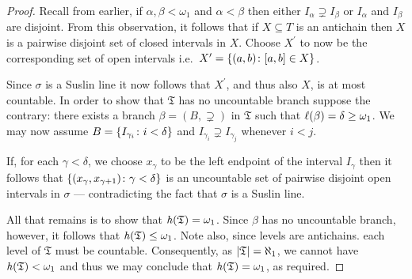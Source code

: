 \begin{proof}
	Recall from earlier, if $\alpha,\beta<\omega_1$ and $\alpha<\beta$ then
	either $I_\alpha\supsetneq I_\beta$ or $I_\alpha$ and $ I_\beta$ are
	disjoint.  From this observation, it follows that if $X\subseteq T$ is an
	antichain then $X$ is a pairwise disjoint set of closed intervals in $X$.
	Choose $X^\prime$ to now be the corresponding set of open intervals i.e.\
	$X^\prime=\left\lbrace (a,b)\colon [a,b]\in X \right\rbrace$.

	Since $\sigma$ is a Suslin line it now follows that $X^\prime$, and thus
	also $X$, is at most countable.  In order to show that $\mathfrak{T}$ has no
	uncountable branch suppose the contrary: there exists a branch
	$\beta=(B,\supsetneq)$ in $\mathfrak{T}$ such that
	$\ell(\beta)=\delta\geq\omega_1$.  We may now assume
	$B=\left\lbrace I_{\gamma_{i}}\colon i<\delta \right\rbrace$ and
	$I_{\gamma_i}\supsetneq I_{\gamma_j}$ whenever $i<j$.

	If, for each $\gamma<\delta$, we choose $x_\gamma$ to be the left endpoint
	of the interval $I_\gamma$ then it follows that
	$\left\lbrace (x_\gamma,x_{\gamma+1})\colon \gamma<\delta \right\rbrace$ is an uncountable set of
	pairwise disjoint open intervals in $\sigma$ --- contradicting the fact that
	$\sigma$ is a Suslin line.

	All that remains is to show that $\mathit{h}(\mathfrak{T})=\omega_1$.  Since
	$\beta$ has no uncountable branch, however, it follows that
	$\mathit{h}(\mathfrak{T})\leq\omega_1$.  Note also, since levels are antichains.
	each level of $\mathfrak{T}$ must be countable.  Consequently, as
	$\left\lvert\mathfrak{T}\right\rvert=\aleph_1$, we cannot have
	$\mathit{h}(\mathfrak{T})<\omega_1$ and thus we may conclude that
	$\mathit{h}(\mathfrak{T})=\omega_1$, as required.
\end{proof}

